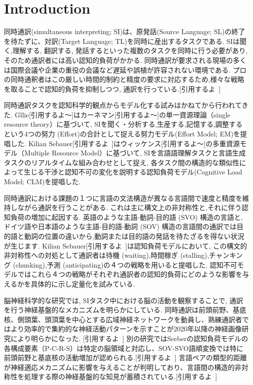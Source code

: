 \section{Introduction}

同時通訳(simultaneous interpreting; SI)は、原発話(Source Language; SL)の終了を待たずに、対訳(Target Language; TL)を同時に産出するタスクである.
SIは聞く,理解する, 翻訳する, 発話するといった複数のタスクを同時に行う必要があり, そのため通訳者には高い認知的負荷がかかる. 
同時通訳が要求される現場の多くは国際会議や企業の重役の会議など遅延や誤植が許容されない環境である.
プロの同時通釈者はこの厳しい時間的制約と精度の要求に対応するため,様々な戦略を取ることで認知的負荷を抑制しつつ, 通訳を行っている.[引用するよ~]

同時通訳タスクを認知科学的観点からモデル化する試みはかねてから行われてきた.
Gllie[引用するよ〜]はカーネマン[引用するよ〜]の単一資源理論（single resource theory）に基づいて, SIを聞く・分析する,生産する,記憶する,調整するという4つの努力 (Effort)の合計として捉える努力モデル(Effort Model; EM)を提唱した.
Kilian Sebauer[引用するよ~]はウィッケンス[引用するよ〜]の多重資源モデル（Multiple Resource Model）に基づいて, SIを言語語理解タスクと言語生成タスクのリアルタイムな組み合わせとして捉え, 各タスク間の構造的な類似性によって生じる干渉と認知不可の変化を説明する認知負荷モデル(Cognitive Load Model; CLM)を提唱した.

同時通訳における課題の１つに言語の文法構造が異なる言語間で速度と精度を維持しながら通訳を行うことがある.
これは主に構文上の非対称性と,それに伴う認知負荷の増加に起因する.
英語のような主語-動詞-目的語 (SVO) 構造の言語と, ドイツ語や日本語のような主語-目的語-動詞 (SOV) 構造の言語間の通訳では目的語と動詞の位置の違いから,動詞または目的語の発話を待たざるを得ない状況が生じます.
Kilian Sebauer[引用するよ~]は認知負荷モデルにおいて, この構文的非対称性への対処として通訳者は待機 (waiting),時間稼ぎ (stalling),チャンキング (chunking),予測 (anticipating)の４つの戦略を用いると提唱した.
認知不可モデルではこれら４つの戦略がそれぞれ通訳者の認知的負荷にどのような影響を与えるかを具体的に示し定量化を試みている.

脳神経科学的な研究では, SIタスク中における脳の活動を観察することで, 通訳を行う神経基盤的なメカニズムを明らかにしている.
同時通訳は前頭前野、基底核、側頭葉、頭頂葉を中心とする広域神経ネットワークを動員し、熟練通訳者ではより効率的で集約的な神経活動パターンを示すことが2020年以降の神経画像研究により明らかになった. [引用するよ~]
別の研究ではSeeberの認知負荷モデルの各構成要素（P-C-R-S）は特定の脳領域と対応し、SOV-SVO語順変換では特に前頭前野と基底核の活動増加が認められる.[引用するよ~]
言語ペアの類型的距離が神経適応メカニズムに影響を与えることが判明しており、言語間の構造的非対称性を処理する際の神経基盤的な知見が蓄積されている.[引用するよ~]

